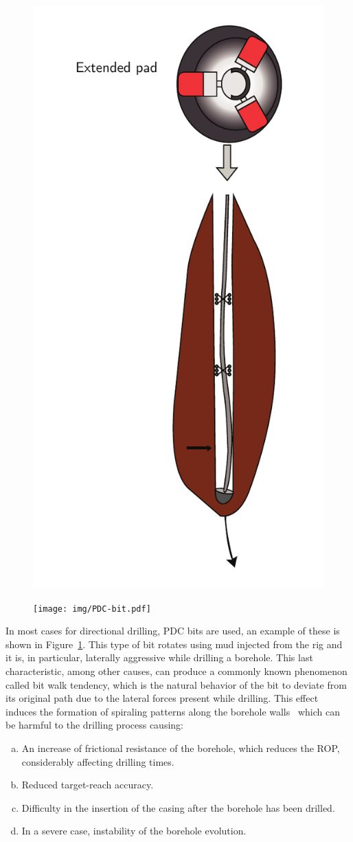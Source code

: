 \begin{figure}
	\centering
	\begin{minipage}[t]{.5\textwidth}
		\centering
		\includegraphics[width=.35\linewidth]{img/RSS.pdf}
		\label{fig:RSS}
	\end{minipage}%
	\begin{minipage}[t]{.5\textwidth}
		\centering
		\texttt{[image: img/PDC-bit.pdf]}
		\label{fig:PDC}
	\end{minipage}
\end{figure}


In most cases for directional drilling, \acf{PDC} bits are used, an example of these is shown in Figure~\ref{fig:PDC}. This type of bit rotates using mud injected from the rig and it is, in particular, laterally aggressive while drilling a borehole. This last characteristic, among other causes, can produce a commonly known phenomenon called bit walk tendency, which is the natural behavior of the bit to deviate from its original path due to the lateral forces present while drilling. This effect induces the formation of spiraling patterns along the borehole walls~\cite{JulienMarckEmmanuelDetournayAndreaKuesters2014} which can be harmful to the drilling process causing:

\begin{enumerate}[(a)]
	\item An increase of frictional resistance of the borehole, which reduces the \acs{ROP}, considerably affecting drilling times.
	\item Reduced target-reach accuracy.
	\item Difficulty in the insertion of the casing after the borehole has been drilled.
	\item In a severe case, instability of the borehole evolution.
\end{enumerate} 

